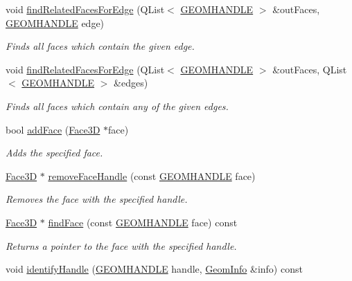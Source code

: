 \begin{DoxyCompactItemize}
void \hyperlink{class_solid3_d_a3a7ce9251333f2ff387292d229ac4aa5}{find\-Related\-Faces\-For\-Edge} (Q\-List$<$ \hyperlink{vertex_8h_a72202e57358ed73cd212e9a2eaf39aeb}{G\-E\-O\-M\-H\-A\-N\-D\-L\-E} $>$ \&out\-Faces, \hyperlink{vertex_8h_a72202e57358ed73cd212e9a2eaf39aeb}{G\-E\-O\-M\-H\-A\-N\-D\-L\-E} edge)
\begin{DoxyCompactList}\small\item\em Finds all faces which contain the given edge. \end{DoxyCompactList}\item 
void \hyperlink{class_solid3_d_aa388640fa5cf2fb0e94630f5480f024e}{find\-Related\-Faces\-For\-Edge} (Q\-List$<$ \hyperlink{vertex_8h_a72202e57358ed73cd212e9a2eaf39aeb}{G\-E\-O\-M\-H\-A\-N\-D\-L\-E} $>$ \&out\-Faces, Q\-List$<$ \hyperlink{vertex_8h_a72202e57358ed73cd212e9a2eaf39aeb}{G\-E\-O\-M\-H\-A\-N\-D\-L\-E} $>$ \&edges)
\begin{DoxyCompactList}\small\item\em Finds all faces which contain any of the given edges. \end{DoxyCompactList}\item 
bool \hyperlink{class_solid3_d_a3976c227473c5954bfac9e2edf4078ea}{add\-Face} (\hyperlink{class_face3_d}{Face3\-D} $\ast$face)
\begin{DoxyCompactList}\small\item\em Adds the specified face. \end{DoxyCompactList}\item 
\hyperlink{class_face3_d}{Face3\-D} $\ast$ \hyperlink{class_solid3_d_a49bec433727595c0aa5fef4097e9d6b2}{remove\-Face\-Handle} (const \hyperlink{vertex_8h_a72202e57358ed73cd212e9a2eaf39aeb}{G\-E\-O\-M\-H\-A\-N\-D\-L\-E} face)
\begin{DoxyCompactList}\small\item\em Removes the face with the specified handle. \end{DoxyCompactList}\item 
\hyperlink{class_face3_d}{Face3\-D} $\ast$ \hyperlink{class_solid3_d_af1e9c9e9c969f7f935296c3706e8f08f}{find\-Face} (const \hyperlink{vertex_8h_a72202e57358ed73cd212e9a2eaf39aeb}{G\-E\-O\-M\-H\-A\-N\-D\-L\-E} face) const 
\begin{DoxyCompactList}\small\item\em Returns a pointer to the face with the specified handle. \end{DoxyCompactList}\item 
void \hyperlink{class_solid3_d_a844ed140f035f5cbeb325687d10e9d32}{identify\-Handle} (\hyperlink{vertex_8h_a72202e57358ed73cd212e9a2eaf39aeb}{G\-E\-O\-M\-H\-A\-N\-D\-L\-E} handle, \hyperlink{struct_geom_info}{Geom\-Info} \&info) const 

\end{DoxyCompactItemize}
